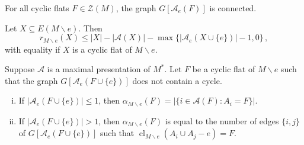 \documentclass[10pt,a4paper]{amsart}
\DeclareMathOperator{\cl}{cl}
\begin{document}
\begin{lemma} \label{lem: flat connected}
For all cyclic flats $F \in \mathcal Z(M)$, the graph $G[\mathcal A_e(F)]$ is connected.	
\end{lemma}

\begin{lemma} \label{lem: flat deletion}
Let $X \subseteq E(M \backslash e)$. Then
$$
r_{M \backslash e}(X) \leq |X| - |\mathcal A(X)| - \max\{|\mathcal A_e(X \cup \{e\})| - 1, 0\} \,,
$$
with equality if $X$ is a cyclic flat of $M \backslash e$.
\end{lemma} 

\begin{lemma} \label{lem: deletion alpha}
Suppose $\mathcal A$ is a maximal presentation of $M^*$. Let $F$ be a cyclic flat of $M \backslash e$ such that the graph $G[\mathcal A_e(F \cup \{e\})]$ does not contain a cycle. 
\begin{enumerate}[(i)]
\item If $|\mathcal A_e(F \cup \{e\})| \leq 1$, then $\alpha_{M \backslash e}(F) = |\{i \in \mathcal A(F) : A_i = F\}|$.

\item If $|\mathcal A_e(F \cup \{e\})| > 1$, then $\alpha_{M \backslash e}(F)$ is equal to the number of edges $\{i,j\}$ of $G[\mathcal A_e(F \cup \{e\})]$ such that $\cl_{M \backslash e}(A_i \cup A_j - e) = F$.
\end{enumerate}
\end{lemma}
\end{document}
